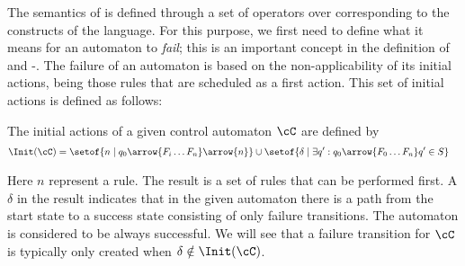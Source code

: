 The semantics of \Lang{} is defined through a set of operators over \CAut{}
corresponding to the constructs of the language. For this purpose, we first
need to define what it means for an automaton to \emph{fail}; this is an
important concept in the definition of \alapK{} and \tryK-\elseK. The failure
of an automaton is based on the non-applicability of its initial actions, being
those rules that are scheduled as a first action.  This set of initial actions
is defined as follows:

\begin{definition}
The initial actions of a given control automaton $\cC$ are defined by
\begin{align*}
\Init(\cC) &= \setof{ n \mid q_0 \arrow{F_i \dotsc F_n}\arrow{n} } \cup
              \setof{ \delta \mid \exists q':q_0 \arrow{F_0 \dotsc F_n} q' \in S }
\end{align*}
\end{definition}
%
Here $n$ represent a rule. The result is a set of rules that can be performed first.
A $\delta$ in the result indicates that in the given automaton there is
a path from the start state to a success state consisting of only failure
transitions. The automaton is considered to be always successful. We will see
that a failure transition for $\cC$ is typically only created when
$\delta\notin \Init(\cC)$.

